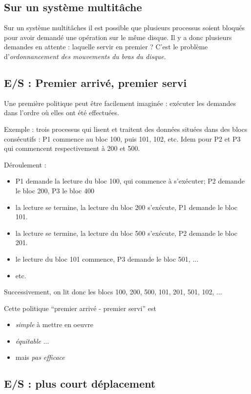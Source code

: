 \begin{multicols}{2}
\subsection{Sur un système multitâche}

Sur un système multitâches il est possible que plusieurs processus
soient bloqués pour avoir demandé une opération sur le même disque.
Il y a donc plusieurs demandes en attente : laquelle servir en premier ?
C'est le problème d'\emph{ordonnancement des mouvements du bras du disque}.

\subsection{E/S : Premier arrivé, premier servi}



Une première politique  peut être facilement imaginée : exécuter les demandes
dans l'ordre où elles ont été effectuées. 


Exemple : 
trois processus qui lisent et traitent des données situées dans des blocs
consécutifs : P1 commence au bloc 100, puis 101, 102, etc.  Idem pour P2 et P3 qui commencent respectivement à 200 et 500.



Déroulement :
\begin{itemize}
\item P1 demande la lecture du bloc 100, qui commence à s'exécuter; P2 demande le bloc 200, P3 le bloc 400
\item la lecture se termine, la lecture du bloc 200 s'exécute,  P1 demande le bloc 101. 
\item la lecture se termine,  la lecture du bloc 500 s'exécute, P2 demande le bloc 201.
\item  le lecture du bloc  101 commence, P3 demande le bloc 501, ...
\item etc.
\end{itemize}
Successivement, on lit donc les blocs 100, 200, 500, 101, 201, 501, 102, ...

Cette politique ``premier arrivé - premier servi'' est
\begin{itemize}
  \item \emph{simple} à mettre en oeuvre
 \item \emph{équitable} ...
 \item mais \emph{pas efficace}
\end{itemize}



\subsection{E/S : plus court déplacement}


\end{multicols}
